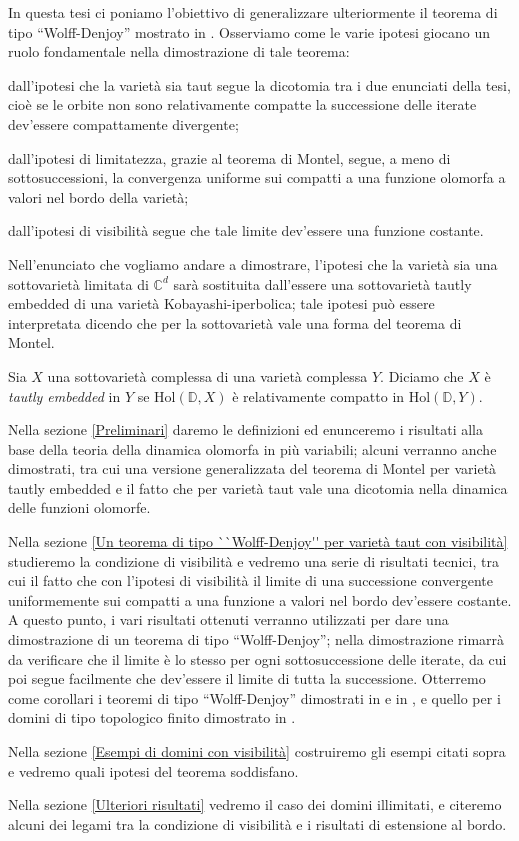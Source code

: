 In questa tesi ci poniamo l'obiettivo di generalizzare ulteriormente il teorema di tipo ``Wolff-Denjoy'' mostrato in \cite{CMS}. Osserviamo come le varie ipotesi giocano un ruolo fondamentale nella dimostrazione di tale teorema:
\begin{nlist}
    \item dall'ipotesi che la varietà sia taut segue la dicotomia tra i due enunciati della tesi, cioè se le orbite non sono relativamente compatte la successione delle iterate dev'essere compattamente divergente;
    \item dall'ipotesi di limitatezza, grazie al teorema di Montel, segue, a meno di sottosuccessioni, la convergenza uniforme sui compatti a una funzione olomorfa a valori nel bordo della varietà;
    \item dall'ipotesi di visibilità segue che tale limite dev'essere una funzione costante.
\end{nlist}

Nell'enunciato che vogliamo andare a dimostrare, l'ipotesi che la varietà sia una sottovarietà limitata di $\mathbb{C}^d$ sarà sostituita dall'essere una sottovarietà tautly embedded di una varietà Kobayashi-iperbolica; tale ipotesi può essere interpretata dicendo che per la sottovarietà vale una forma del teorema di Montel.

\begin{defn}
    Sia $X$ una sottovarietà complessa di una varietà complessa $Y$. Diciamo che $X$ è \textit{tautly embedded} in $Y$ se $\text{Hol}(\mathbb{D},X)$ è relativamente compatto in $\text{Hol}(\mathbb{D},Y)$.
\end{defn}

Nella sezione \ref{Preliminari} daremo le definizioni ed enunceremo i risultati alla base della teoria della dinamica olomorfa in più variabili; alcuni verranno anche dimostrati, tra cui una versione generalizzata del teorema di Montel per varietà tautly embedded e il fatto che per varietà taut vale una dicotomia nella dinamica delle funzioni olomorfe.

Nella sezione \ref{Un teorema di tipo ``Wolff-Denjoy'' per varietà taut con visibilità} studieremo la condizione di visibilità e vedremo una serie di risultati tecnici, tra cui il fatto che con l'ipotesi di visibilità il limite di una successione convergente uniformemente sui compatti a una funzione a valori nel bordo dev'essere costante. A questo punto, i vari risultati ottenuti verranno utilizzati per dare una dimostrazione di un teorema di tipo ``Wolff-Denjoy''; nella dimostrazione rimarrà da verificare che il limite è lo stesso per ogni sottosuccessione delle iterate, da cui poi segue facilmente che dev'essere il limite di tutta la successione. Otterremo come corollari i teoremi di tipo ``Wolff-Denjoy'' dimostrati in \cite{A2} e in \cite{CMS}, e quello per i domini di tipo topologico finito dimostrato in \cite{BM}.

Nella sezione \ref{Esempi di domini con visibilità} costruiremo gli esempi citati sopra e vedremo quali ipotesi del teorema soddisfano.

Nella sezione \ref{Ulteriori risultati} vedremo il caso dei domini illimitati, e citeremo alcuni dei legami tra la condizione di visibilità e i risultati di estensione al bordo.